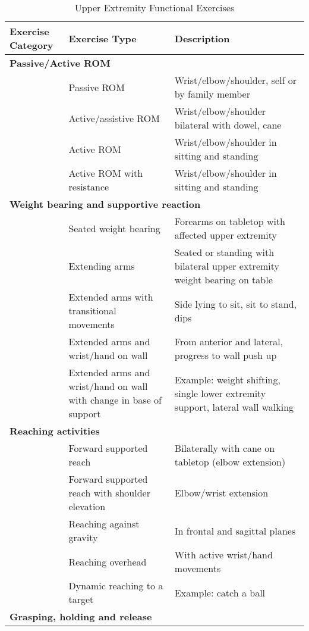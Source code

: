 \begin{table}[htbp]
  \centering
  \caption{Upper Extremity Functional Exercises}
  \label{table:ue_exercises}
  \small %
  \setlength{\tabcolsep}{4pt} %
  \begin{tabular}{p{2.5cm}p{5cm}p{7cm}}
    \toprule
    \textbf{Exercise Category} & \textbf{Exercise Type} & \textbf{Description} \\
    \midrule
    \multicolumn{3}{l}{\textbf{Passive/Active ROM}} \\
     & Passive ROM & Wrist/elbow/shoulder, self or by family member \\
     & Active/assistive ROM & Wrist/elbow/shoulder bilateral with dowel, cane \\
     & Active ROM & Wrist/elbow/shoulder in sitting and standing \\
     & Active ROM with resistance & Wrist/elbow/shoulder in sitting and standing \\
    \multicolumn{3}{l}{\textbf{Weight bearing and supportive reaction}} \\
     & Seated weight bearing & Forearms on tabletop with affected upper extremity \\
     & Extending arms & Seated or standing with bilateral upper extremity weight bearing on table \\
     & Extended arms with transitional movements & Side lying to sit, sit to stand, dips \\
     & Extended arms and wrist/hand on wall & From anterior and lateral, progress to wall push up \\
     & Extended arms and wrist/hand on wall with change in base of support & Example: weight shifting, single lower extremity support, lateral wall walking \\
    \multicolumn{3}{l}{\textbf{Reaching activities}} \\
     & Forward supported reach & Bilaterally with cane on tabletop (elbow extension) \\
     & Forward supported reach with shoulder elevation & Elbow/wrist extension \\
     & Reaching against gravity & In frontal and sagittal planes \\
     & Reaching overhead & With active wrist/hand movements \\
     & Dynamic reaching to a target & Example: catch a ball \\
    \multicolumn{3}{l}{\textbf{Grasping, holding and release}} \\

\end{tabular}
\end{table}

